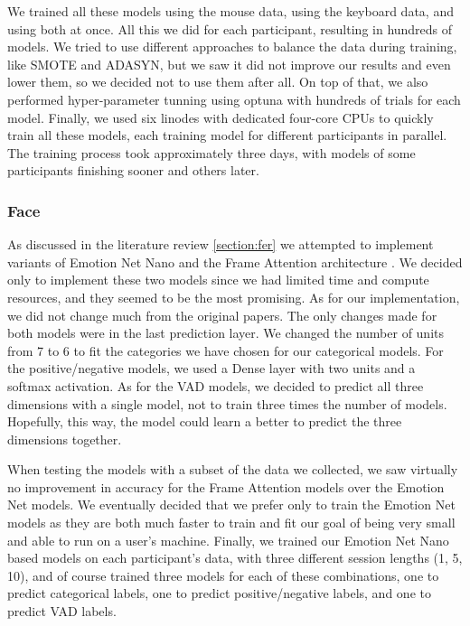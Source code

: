 \documentclass[../main.tex]{subfiles}
\begin{document}
    We trained all these models using the mouse data, using the keyboard data, 
    and using both at once. All this we did for each participant, resulting in hundreds of models. We tried to use different approaches to balance 
    the data during training, like SMOTE and ADASYN, but we saw it did not improve our results and even lower them, so we decided not to use them after all.
    On top of that, we also performed hyper-parameter tunning using optuna \cite{optuna} with hundreds of trials for each model. 
    Finally, we used six linodes with dedicated four-core CPUs to quickly train all these models, each training model for different 
    participants in parallel. The training process took approximately three days, with models of some participants finishing sooner and others later.



    \subsubsection{Face}

    As discussed in the literature review \ref{section:fer} we attempted to implement variants of Emotion Net Nano
    \cite{emotionnet-nano} and the Frame Attention architecture \cite{fan}. 
    We decided only to implement these two models since we had limited time and compute resources, 
    and they seemed to be the most promising. As for our implementation, we did not change much from the original papers. 
    The only changes made for both models were in the last prediction layer. We changed the number of units from 7 to 6 to 
    fit the categories we have chosen for our categorical models. For the positive/negative models, we used a Dense layer with 
    two units and a softmax activation. As for the VAD models, we decided to predict all three dimensions with a single model, 
    not to train three times the number of models. Hopefully, this way, the model could learn a better to predict the three dimensions together.

    When testing the models with a subset of the data we collected,
    we saw virtually no improvement in accuracy for the Frame Attention models over the Emotion Net models. We eventually 
    decided that we prefer only to train the Emotion Net models as they are both much faster to train and fit our goal of being very 
    small and able to run on a user's machine. Finally, we trained our Emotion Net Nano based models on each participant's data, 
    with three different session lengths (1, 5, 10), and of course trained three models for each of these combinations, 
    one to predict categorical labels, one to predict positive/negative labels, and one to predict VAD labels. 
\end{document}
